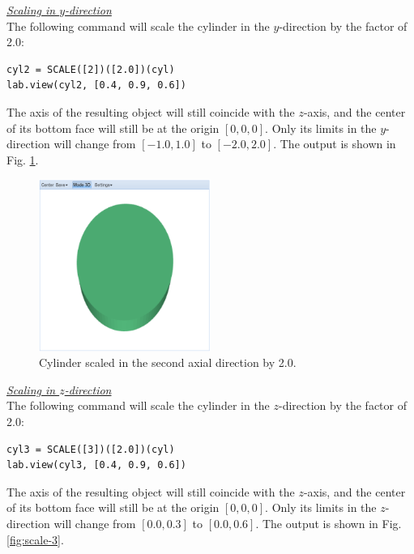\documentclass[article,A4,12pt]{llncs}
\begin{document}
\noindent
\underline{\em Scaling in $y$-direction}\\

The following command will 
scale the cylinder in the $y$-direction by the factor of 2.0: 

\begin{verbatim}
cyl2 = SCALE([2])([2.0])(cyl)
lab.view(cyl2, [0.4, 0.9, 0.6])
\end{verbatim}
The axis of the resulting object will still
coincide with the $z$-axis, and the center of its bottom face will
still be at the origin $[0, 0, 0]$. Only its limits in the $y$-direction will change 
from $[-1.0, 1.0]$ to $[-2.0, 2.0]$.
The output is shown in Fig. \ref{fig:scale-2}.

\newpage

\begin{figure}[!ht]
\begin{center}
\includegraphics[width=0.5\textwidth]{img/scale-2.png}
\end{center}
\vspace{-2mm}
\caption{Cylinder scaled in the second axial direction by 2.0.}
\label{fig:scale-2}
\end{figure}

\noindent
\underline{\em Scaling in $z$-direction}\\

The following command will 
scale the cylinder in the $z$-direction by the factor of 2.0: 

\begin{verbatim}
cyl3 = SCALE([3])([2.0])(cyl)
lab.view(cyl3, [0.4, 0.9, 0.6])
\end{verbatim}
The axis of the resulting object will still
coincide with the $z$-axis, and the center of its bottom face will
still be at the origin $[0, 0, 0]$. Only its limits in the $z$-direction will change 
from $[0.0, 0.3]$ to $[0.0, 0.6]$. The output is shown in Fig. \ref{fig:scale-3}.
\end{document}
